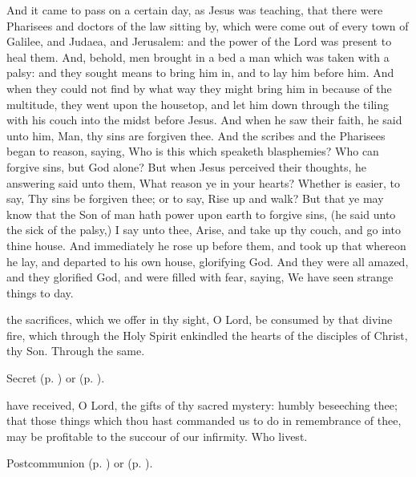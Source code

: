  And it came to pass on a certain day, as Jesus was teaching, that there were Pharisees and doctors of the law sitting by, which were come out of every town of Galilee, and Judaea, and Jerusalem: and the power of the Lord was present to heal them. And, behold, men brought in a bed a man which was taken with a palsy: and they sought means to bring him in, and to lay him before him. And when they could not find by what way they might bring him in because of the multitude, they went upon the housetop, and let him down through the tiling with his couch into the midst before Jesus. And when he saw their faith, he said unto him, Man, thy sins are forgiven thee. And the scribes and the Pharisees began to reason, saying, Who is this which speaketh blasphemies? Who can forgive sins, but God alone? But when Jesus perceived their thoughts, he answering said unto them, What reason ye in your hearts? Whether is easier, to say, Thy sins be forgiven thee; or to say, Rise up and walk? But that ye may know that the Son of man hath power upon earth to forgive sins, (he said unto the sick of the palsy,) I say unto thee, Arise, and take up thy couch, and go into thine house. And immediately he rose up before them, and took up that whereon he lay, and departed to his own house, glorifying God. And they were all amazed, and they glorified God, and were filled with fear, saying, We have seen strange things to day.


\secret
{} the sacrifices, which we offer in thy sight, O Lord, be consumed by that divine fire, which through the Holy Spirit enkindled the hearts of the disciples of Christ, thy Son. Through the same.
\begin{rubric}
     Secret  (p. \pageref{SPAgainst}) or  (p. \pageref{SPChiefBishop}).
\end{rubric}


\postcommunion
{} have received, O Lord, the gifts of thy sacred mystery: humbly beseeching thee; that those things which thou hast commanded us to do in remembrance of thee, may be profitable to the succour of our infirmity. Who livest.
\begin{rubric}
     Postcommunion  (p. \pageref{SPAgainst}) or  (p. \pageref{SPChiefBishop}).
\end{rubric}


